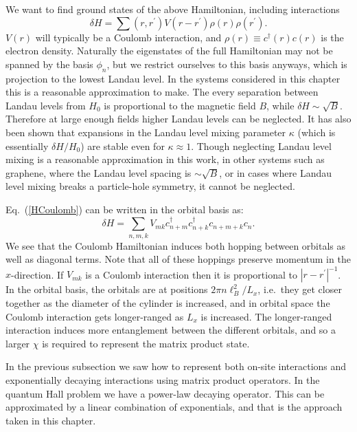 We want to find ground states of the above Hamiltonian, including interactions
\begin{equation}
\delta H=\sum(r,r^\prime) V(r-r^\prime) \rho(r)\rho(r^\prime).
\label{HCoulomb}
\end{equation}
$V(r)$ will typically be a Coulomb interaction, and $\rho(r)\equiv c^\dagger(r)c(r)$ is the electron density. Naturally the eigenstates of the full Hamiltonian may not be spanned by the basis $\phi_n$, but we restrict ourselves to this basis anyways, which is projection to the lowest Landau level. In the systems considered in this chapter this is a reasonable approximation to make. The every separation between Landau levels from $H_0$ is proportional to the magnetic field $B$, while $\delta H\sim\sqrt{B}$. Therefore at large enough fields higher Landau levels can be neglected. It has also been shown that expansions in the Landau level mixing parameter $\kappa$ (which is essentially $\delta H/H_0$) are stable even for $\kappa\approx1$. Though neglecting Landau level mixing is a reasonable approximation in this work, in other systems such as graphene, where the Landau level spacing is $\sim\sqrt{B}$, or in cases where Landau level mixing breaks a particle-hole symmetry, it cannot be neglected.

Eq.~(\ref{HCoulomb}) can be written in the orbital basis as: 
\begin{equation}
\delta H=\sum_{n,m,k} V_{mk} c^{\dagger}_{n+m} c_{n+k}^{\dagger} c_{n+m+k} c_{n}.
\end{equation}
We see that the Coulomb Hamiltonian induces both hopping between orbitals as well as diagonal terms. Note that all of these hoppings preserve momentum in the $x$-direction. If $V_{mk}$ is a Coulomb interaction then it is proportional to $|r-r^\prime|^{-1}$. In the orbital basis, the orbitals are at positions $2\pi n \ell_B^2/L_x$, i.e.~they get closer together as the diameter of the cylinder is increased, and in orbital space the Coulomb interaction gets longer-ranged as $L_x$ is increased. The longer-ranged interaction induces more entanglement between the different orbitals, and so a larger $\chi$ is required to represent the matrix product state. 

In the previous subsection we saw how to represent both on-site interactions and exponentially decaying interactions using matrix product operators. In the quantum Hall problem we have a power-law decaying operator. This can be approximated by a linear combination of exponentials, and that is the approach taken in this chapter\cite{ZaletelQHdmrg13}. 

